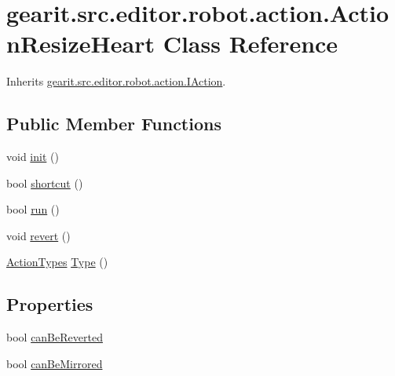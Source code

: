 \hypertarget{classgearit_1_1src_1_1editor_1_1robot_1_1action_1_1_action_resize_heart}{\section{gearit.\+src.\+editor.\+robot.\+action.\+Action\+Resize\+Heart Class Reference}
\label{classgearit_1_1src_1_1editor_1_1robot_1_1action_1_1_action_resize_heart}
}


Inherits \hyperlink{interfacegearit_1_1src_1_1editor_1_1robot_1_1action_1_1_i_action}{gearit.\+src.\+editor.\+robot.\+action.\+I\+Action}.

\subsection*{Public Member Functions}
\begin{DoxyCompactItemize}
\item 
void \hyperlink{classgearit_1_1src_1_1editor_1_1robot_1_1action_1_1_action_resize_heart_adfc179dbbd45e06db104dedc74b8e9e0}{init} ()
\item 
bool \hyperlink{classgearit_1_1src_1_1editor_1_1robot_1_1action_1_1_action_resize_heart_ab68bdd5f8a60369e39266fe16cbada1c}{shortcut} ()
\item 
bool \hyperlink{classgearit_1_1src_1_1editor_1_1robot_1_1action_1_1_action_resize_heart_ae4ac9383fd69faf7387a8cdbd502c99a}{run} ()
\item 
void \hyperlink{classgearit_1_1src_1_1editor_1_1robot_1_1action_1_1_action_resize_heart_a5c4866c85c911457995955f4da3be660}{revert} ()
\item 
\hyperlink{namespacegearit_1_1src_1_1editor_1_1robot_1_1action_a4be0fd46e3952d6135136b20e7b3fc5e}{Action\+Types} \hyperlink{classgearit_1_1src_1_1editor_1_1robot_1_1action_1_1_action_resize_heart_a45b149007b20dd381eeb97a3e6cfcfc4}{Type} ()
\end{DoxyCompactItemize}
\subsection*{Properties}
\begin{DoxyCompactItemize}
\item 
bool \hyperlink{classgearit_1_1src_1_1editor_1_1robot_1_1action_1_1_action_resize_heart_a54efd57a9c57d31bab42f87b8e8ed1f3}{can\+Be\+Reverted}
\item 
bool \hyperlink{classgearit_1_1src_1_1editor_1_1robot_1_1action_1_1_action_resize_heart_ab5a5a08dbe68597f3b36171d0759bbe1}{can\+Be\+Mirrored}
\end{DoxyCompactItemize}


